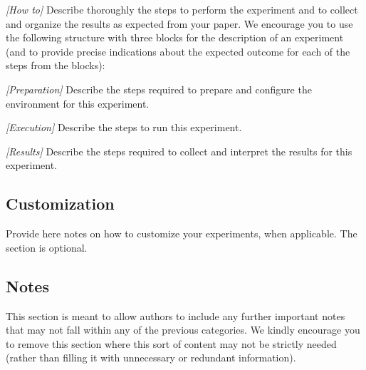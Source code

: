 \documentclass[conference]{IEEEtran}
\begin{document}
\textit{[How to]} Describe thoroughly the steps to perform the experiment and to collect and organize the results as expected from your paper. We encourage you to use the following structure with three blocks for the description of an experiment (and to provide precise indications about the expected outcome for each of the steps from the blocks):

\textit{[Preparation]}
Describe the steps required to prepare and configure the environment for this experiment.

\textit{[Execution]}
Describe the steps to run this experiment.

\textit{[Results]}
Describe the steps required to collect and interpret the results for this experiment.

\subsection{Customization}
Provide here notes on how to customize your experiments, when applicable. The section is optional.

\subsection{Notes}
This section is meant to allow authors to include any further important notes that may not fall within any of the previous categories. We kindly encourage you to remove this section where this sort of content may not be strictly needed (rather than filling it with unnecessary or redundant information).

\end{document}
